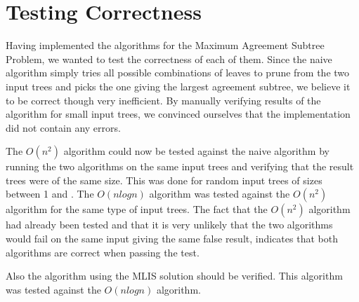 \chapter{Testing Correctness}
Having implemented the algorithms for the Maximum Agreement Subtree Problem, we wanted to test the correctness of each of them. Since the naive algorithm simply tries all possible combinations of leaves to prune from the two input trees and picks the one giving the largest agreement subtree, we believe it to be correct though very inefficient. By manually verifying results of the algorithm for small input trees, we convinced ourselves that the implementation did not contain any errors.

The $O(n^2)$ algorithm could now be tested against the naive algorithm by running the two algorithms on the same input trees and verifying that the result trees were of the same size. This was done for random input trees of sizes between 1 and . The $O(nlogn)$ algorithm was tested against the $O(n^2)$ algorithm for the same type of input trees. The fact that the $O(n^2)$ algorithm had already been tested and that it is very unlikely that the two algorithms would fail on the same input giving the same false result, indicates that both algorithms are correct when passing the test.

Also the algorithm using the MLIS solution should be verified. This algorithm was tested against the $O(nlogn)$ algorithm.